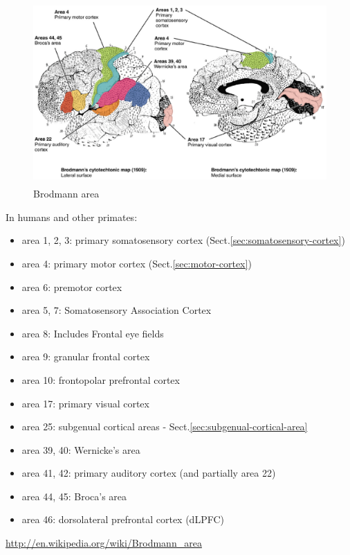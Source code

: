 \begin{figure}[hbt]
  \centerline{
  \includegraphics[height=7cm,
    angle=0]{./images/brain_areas.eps}}
\caption{Brodmann area}
\label{fig:brain_areas}
\label{fig:Brodmann_area}
\end{figure}

In humans and other primates:
\begin{itemize}
  \item area 1, 2, 3:  primary somatosensory cortex (Sect.\ref{sec:somatosensory-cortex})
  \item area 4: 	 primary motor cortex (Sect.\ref{sec:motor-cortex})
  \item area 6: premotor cortex
  \item area 5, 7: Somatosensory Association Cortex
  \item area 8: Includes Frontal eye fields
  \item area 9: granular frontal cortex
  \item area 10: frontopolar prefrontal cortex
  \item area 17: primary visual cortex
  
  \item area 25: subgenual cortical areas -
  Sect.\ref{sec:subgenual-cortical-area}
  
  \item area 39, 40: Wernicke's area
  \item area 41, 42: primary auditory cortex (and partially area 22)
  \item area 44, 45: Broca's area
  \item area 46: dorsolateral prefrontal cortex (dLPFC) 
  
\end{itemize}
\url{http://en.wikipedia.org/wiki/Brodmann_area}





